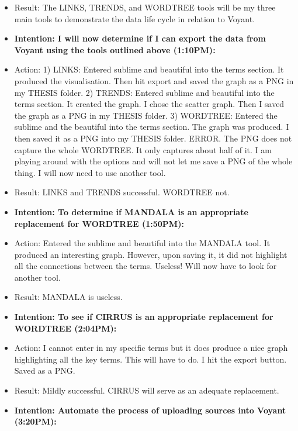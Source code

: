\documentclass[a4paper,12pt]{article}
\begin{document}
\begin{itemize}
\item Result: The LINKS, TRENDS, and WORDTREE tools will be my three main tools to demonstrate the data life cycle in relation to Voyant. 


\item \textbf{Intention: I will now determine if I can export the data from Voyant using the tools outlined above (1:10PM):}


\item Action: 1) LINKS: Entered sublime and beautiful into the terms section. It produced the visualisation. Then hit export and saved the graph as a PNG in my THESIS folder. 2) TRENDS: Entered sublime and beautiful into the terms section. It created the graph. I chose the scatter graph. Then I saved the graph as a PNG in my THESIS folder. 3) WORDTREE: Entered the sublime and the beautiful into the terms section. The graph was produced. I then saved it as a PNG into my THESIS folder. ERROR. The PNG does not capture the whole WORDTREE. It only captures about half of it. I am playing around with the options and will not let me save a PNG of the whole thing. I will now need to use another tool. 


\item Result: LINKS and TRENDS successful. WORDTREE not. 


\item \textbf{Intention: To determine if MANDALA is an appropriate replacement for WORDTREE (1:50PM):}


\item Action: Entered the sublime and beautiful into the MANDALA tool. It produced an interesting graph. However, upon saving it, it did not highlight all the connections between the terms. Useless! Will now have to look for another tool.


\item Result: MANDALA is useless. 


\item \textbf{Intention: To see if CIRRUS is an appropriate replacement for WORDTREE (2:04PM):}


\item Action: I cannot enter in my specific terms but it does produce a nice graph highlighting all the key terms. This will have to do. I hit the export button. Saved as a PNG. 


\item Result: Mildly successful. CIRRUS will serve as an adequate replacement. 


\item \textbf{Intention: Automate the process of uploading sources into Voyant (3:20PM):}



\end{itemize}
\end{document}
